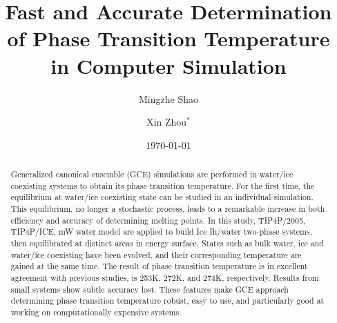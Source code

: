 \documentclass[aps,prl,twocolumn,superscriptaddress]{revtex4-1}
\begin{document}
\title{Fast and Accurate Determination of Phase Transition Temperature in Computer Simulation}
\author{Mingzhe Shao}

\author{Xin Zhou$^{*}$}


\date{\today}
 


 
\begin{abstract}  
Generalized canonical ensemble (GCE) simulations are performed in water/ice coexisting systems to obtain its phase transition temperature. For the first time, the equilibrium at water/ice coexisting state can be studied in an individual simulation. This equilibrium, no longer a stochastic process, leads to a remarkable increase in both efficiency and accuracy of determining melting points. In this study, TIP4P/2005, TIP4P/ICE, mW water model are applied to build Ice Ih/water two-phase systems, then equilibrated at distinct areas in energy surface. States such as bulk water, ice and water/ice coexisting have been evolved, and their corresponding temperature are gained at the same time. The result of phase transition temperature is in excellent agreement with previous studies, is 253K, 272K, and 274K, respectively. Results from small systems show subtle accuracy lost.  These features make GCE approach 
determining phase transition temperature robust, easy to use, and particularly good at working on computationally expensive systems.
\end{abstract}
\end{document}
